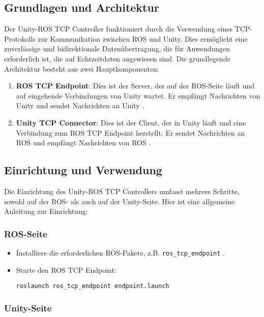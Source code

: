\subsection{Grundlagen und Architektur}

Der Unity-ROS TCP Controller funktioniert durch die Verwendung eines TCP-Protokolls zur Kommunikation zwischen ROS und Unity. Dies ermöglicht eine zuverlässige und bidirektionale Datenübertragung, die für Anwendungen erforderlich ist, die auf Echtzeitdaten angewiesen sind. Die grundlegende Architektur besteht aus zwei Hauptkomponenten:

\begin{enumerate}
    \item \textbf{ROS TCP Endpoint}: Dies ist der Server, der auf der ROS-Seite läuft und auf eingehende Verbindungen von Unity wartet. Er empfängt Nachrichten von Unity und sendet Nachrichten an Unity \cite{ros_tcp_endpoint}.
    \item \textbf{Unity TCP Connector}: Dies ist der Client, der in Unity läuft und eine Verbindung zum ROS TCP Endpoint herstellt. Er sendet Nachrichten an ROS und empfängt Nachrichten von ROS \cite{unity_ros_tcp_connector}.
\end{enumerate}

\subsection{Einrichtung und Verwendung}

Die Einrichtung des Unity-ROS TCP Controllers umfasst mehrere Schritte, sowohl auf der ROS- als auch auf der Unity-Seite. Hier ist eine allgemeine Anleitung zur Einrichtung:

\subsubsection{ROS-Seite}

\begin{itemize}
    \item Installiere die erforderlichen ROS-Pakete, z.B. \texttt{ros\_tcp\_endpoint} \cite{ros_tcp_endpoint}.
    \item Starte den ROS TCP Endpoint:
    \begin{verbatim}
roslaunch ros_tcp_endpoint endpoint.launch
    \end{verbatim}
\end{itemize}

\subsubsection{Unity-Seite}

